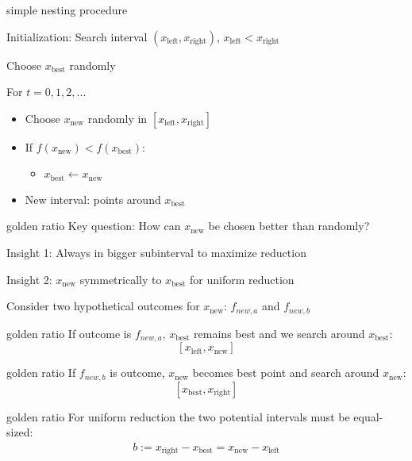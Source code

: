 \documentclass[11pt,compress,t,notes=noshow, xcolor=table]{beamer}
\newcommand{\xleft}{x_{\text{left}}} %
\newcommand{\xright}{x_{\text{right}}} %
\newcommand{\xnew}{x_{\text{new}}} %
\newcommand{\xbest}{x_{\text{best}}} %
\begin{document}
\begin{framei}{simple nesting procedure}
\item Initialization: Search interval  $(\xleft, \xright)$, $\xleft < \xright$
\item Choose $\xbest$ randomly
\item For $t = 0, 1, 2, ...$
\begin{itemize}
\item Choose $\xnew$ randomly in $[\xleft, \xright]$
\item If $f(\xnew) < f(\xbest)$:
\begin{itemize}
\item $\xbest \leftarrow \xnew$
\end{itemize}
\item New interval: points around $\xbest$
\end{itemize}
\end{framei}

\begin{frame2}{golden ratio}
Key question: How can $\xnew$ be chosen better than randomly? 
\begin{itemizeM}
\item Insight 1: Always in bigger subinterval to maximize reduction
\item Insight 2: $\xnew$ symmetrically to $\xbest$ for uniform reduction
\end{itemizeM}
\vspace{-1cm}
Consider two hypothetical outcomes for $\xnew$: $f_{new, a}$ and $f_{new, b}$
\end{frame2}

\begin{frame2}{golden ratio}
If outcome is $f_{new, a}$, $\xbest$ remains best and we search around $\xbest$: $$[\xleft, \xnew]$$
\vfill
{}
\end{frame2}

\begin{frame2}{golden ratio}
If $f_{new, b}$ is outcome, $\xnew$ becomes best point and search around $\xnew$: $$[\xbest, \xright]$$
\vfill
{}
\end{frame2}

\begin{frame2}{golden ratio}
For uniform reduction the two potential intervals must be equal-sized: 
\begin{align*}
b := \xright - \xbest = \xnew - \xleft
\end{align*}
\vfill
{}
\end{frame2}
\end{document}
